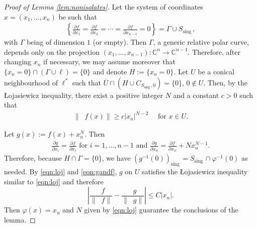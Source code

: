 \documentclass[10pt,a4paper]{amsart}
\DeclareMathOperator{\grad}{grad{}}
\DeclareMathOperator{\sing}{sing \, }
\newcommand{\C}{\mathbb{C}}
\begin{document}
  \begin{proof}[Proof of Lemma \ref{lem:nonisolates}] 
Let the system of coordinates $x=(x_1, \ldots , x_n)$ be such that  
\begin{align}\label{eqn:polar}
\left \{ \frac{\partial f}{\partial x_1}= \frac{\partial f}{\partial x_2}
= \cdots =\frac{\partial f}{\partial x_{n-1} }=0 \right \} = \Gamma \cup 
S_{\sing}, %
\end{align} 
with $\Gamma$ being of dimension $1$ (or empty).  Then $\Gamma$, a generic relative polar curve,  depends only on the projection $(x_1, \ldots , x_{n-1}) : \C^n \to \C^{n-1}$.  Therefore, after changing $x_n$ if necessary, we may assume moreover that $\{x_n=0\} \cap (\Gamma \cup \ell) = \{0\}$ and   
denote $H:=\{x_n=0\}$.  
Let $U$ be a conical neighbourhood of $\ell^*$ such that  $\overline U \cap (H\cup C_{S_{\sing},0}) = \{0\}$, $0\notin U$.  Then, by the {\L}ojasiewicz inequality, there exist a positive integer $N$ and a constant $c>0$ such that 
\begin{align}\label{eqn:loj}
\|\grad f (x)\| \ge c |x_n|^{N-2} \quad \text { for } x\in U.
\end{align}

Let $g(x):= f(x) + x_n^N$.  Then 
\begin{align}\label{eqn:gandf}
\frac{\partial g}{\partial x_i} = \frac{\partial f}{\partial x_i} \text { for } i= 1, \ldots  ,n-1 
\text { and } \frac{\partial g}{\partial x_n} = \frac{\partial f}{\partial x_n} + Nx_n^{N-1}. 
\end{align}
Therefore, because $H\cap \Gamma = \{0\}$, we have $(g^{-1} (0))_{\sing}= S_{\sing} \cap \varphi^{-1} (0)$ as needed.  By \eqref{eqn:loj} and \eqref{eqn:gandf}, $g$ on $U$ satisfies the {\L}ojasiewicz inequality similar to \eqref{eqn:loj} 
 and therefore 
$$
\left | \frac{\grad f}{\|\grad f\|} -\frac{\grad g}{\|\grad g\|} \right | \le C |x_n| .
$$
Then $\varphi (x) = x_n$ and $N$ given by \eqref{eqn:loj} guarantee  the conclusions of the lemma. 
 \end{proof}
\end{document}
